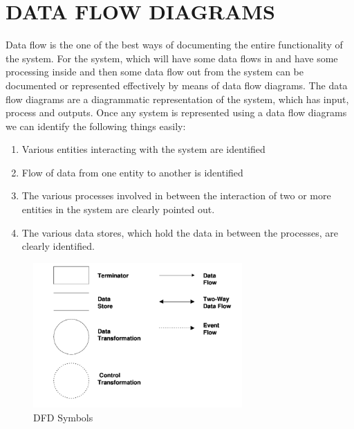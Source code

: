 \chapter{DATA FLOW DIAGRAMS}

Data flow is the one of the best ways of documenting the entire functionality of the system. For the system, which will have some data flows in and have some processing inside and then some data flow out from the system can be documented or represented effectively by means of data flow diagrams. The data flow diagrams are a diagrammatic representation of the system, which has input, process and outputs. Once any system is represented using a data flow diagrams we can identify the following things easily: 
\begin{enumerate}
\item Various entities interacting with the system are identified
\item Flow of data from one entity to another is identified
\item The various processes involved in between the interaction of two or more entities in the system are clearly pointed out.  
\item The various data stores, which hold the data in between the processes, are clearly identified.
\end{enumerate}

\begin{figure}[!h]
	\begin{center}
		\includegraphics[width=8cm]{DFD_Symbols}
	\end{center}
\caption{DFD Symbols}
\end{figure}


